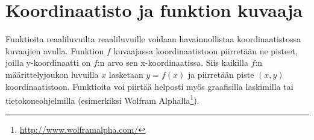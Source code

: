 \chapter{Koordinaatisto ja funktion kuvaaja}
Funktioita reaaliluvuilta reaaliluvuille voidaan havainnollistaa koordinaatistossa kuvaajien avulla. Funktion $f$ kuvaajassa koordinaatistoon piirretään ne pisteet, joilla y-koordinaatti on $f$:n arvo sen x-koordinaatissa. Siis kaikilla $f$:n määrittelyjoukon luvuilla $x$ lasketaan $y = f(x)$ ja piirretään piste $(x, y)$ koordinaatistoon. Funktioita voi piirtää helposti myös graafisilla laskimilla tai tietokoneohjelmilla (esimerkiksi Wolfram Alphalla\footnote{\url{http://www.wolframalpha.com/}}).

\def\vcent#1{\mathsurround0pt$\vcenter{\hbox{#1}}$}



